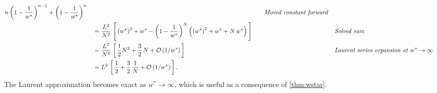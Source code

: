 \begin{proofEnd}
\begin{alignat}{2}
      n \, {\left(1 - \frac{1}{w^*}\right)}^{n-1}
      +
      {\left(1 - \frac{1}{w^*}\right)}^{n} 
    \nonumber
    &&\quad\text{\textit{Moved constant forward}}
    \\
    &\quad=
    \frac{L^2}{N^2} \,
    \left[\,
      {\left(w^*\right)}^2 + w^*
      -
      {\left(1 - \frac{1}{w^*}\right)}^N
      \left(
        {\left(w^*\right)}^2 + w^* + N\,w^*
      \right)
    \,\right]
    \nonumber
    &&\quad\text{\textit{Solved sum}}
    \\
    &\quad=
    \frac{L^2}{N^2} \,
    \left[\,
    \frac{1}{2} N^2 + \frac{3}{2}\,N 
    + \mathcal{O}\left(1/w^*\right)
    \,\right]
    \nonumber
    &&\quad\text{\textit{Laurent series expansion at \(w^* \rightarrow \infty\)}}
    \\
    &\quad=
    L^2 \,
    \left[\,
    \frac{1}{2} + \frac{3}{2}\,\frac{1}{N}
    + \mathcal{O}\left(1/w^*\right)
    \,\right].
    \nonumber
  \end{alignat}
  The Laurent approximation becomes exact as \(w^* \rightarrow \infty\), which is useful as a consequence of \cref{thm:wstar}.
\end{proofEnd}


